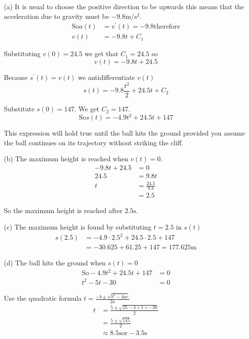 (a) It is usual to choose the positive direction
to be upwards this means that the acceleration due to gravity must be $ -9.8 \mbox{m}$/$\mathrm{s}^{2}$.
\begin{align*}\text{So}a (t) &  = v^{ \prime } (t) = -9.8\text{therefore} \\
v (t) &  =  -9.8 t +C_{1}\end{align*}

Substituting $v (0) =24.5$ we get that $C_{1} =24.5$ so
\begin{equation*}v (t) = -9.8 t +24.5
\end{equation*}

Because $s^{ \prime } (t) =v (t)$ we antidifferentiate $v (t)$
\begin{equation*}s (t) = -9.8 \frac{t^{2}}{2} +24.5 t +C_{2}
\end{equation*}

Substitute $s (0) =147$. We get $C_{2} =147$.
\begin{equation*}\text{So}s (t) = -4.9 t^{2} +24.5 t +147
\end{equation*}

This expression will hold true until the ball hits the ground provided you assume the ball continues
on its trajectory without striking the cliff. 

(b) The maximum height is reached when $v (t) =0$.
\begin{align*} -9.8 t +24.5 &  = 0 \\
24.5 &  = 9.8 t \\
t &  = \frac{24.5}{9.8} \\
 &  = 2.5\end{align*}

So the maximum height is reached after $2.5 \mbox{s}$. 

(c) The maximum height is found by substituting
$t =2.5$ in $s (t)$
\begin{align*}s (2.5) &  =  -4.9 \cdot 2.5^{2} +24.5 \cdot 2.5 +147 \\
 &  =  -30.625 +61.25 +147 =177.625 \mbox{m}\end{align*}

(d) The ball hits the ground when $s (t) =0$
\begin{align*}\text{So} -4.9 t^{2} +24.5 t +147 &  = 0 \\
t^{2} -5 t -30 &  = 0\end{align*}

Use the quadratic formula $t =\frac{ -b \pm \sqrt{b^{2} -4 a c}}{2 a}$
\begin{align*}t &  = \frac{5 \pm \sqrt{25 -4 \times 1 \times  -30}}{2} \\
 &  = \frac{5 \pm \sqrt{145}}{2} \\
 &  \approx 8.5\text{}\mbox{s}\text{or} -3.5\text{}\mbox{s}\end{align*}


